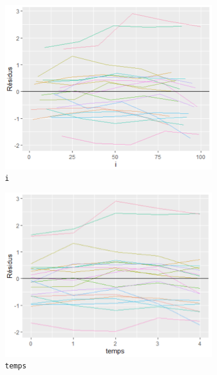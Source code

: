 \documentclass{article}
\begin{document}
\begin{figure}[H]  %
	\centering
	\begin{subfigure}{0.48\textwidth}
		\includegraphics[width=1\textwidth]{graphiques/residus_VS_id_qst2}
		\caption{\texttt{i}}
		\label{residus_VS_id_qst2}
	\end{subfigure}
	\begin{subfigure}{0.48\textwidth}
		\includegraphics[width=1\textwidth]{graphiques/Residus_VS_temps_qst2}
		\caption{\texttt{temps}}
		\label{Residus_VS_temps_qst2}
	\end{subfigure}
	\begin{subfigure}{0.48\textwidth}

\end{subfigure}
\end{figure}
\end{document}
